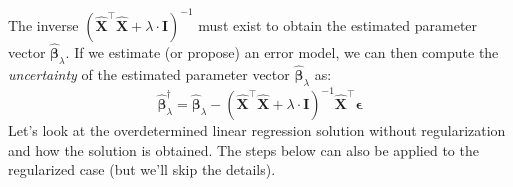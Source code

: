 \documentclass{article}[11pt]
\begin{document}
The inverse $\left(\hat{\mathbf{X}}^{\top}\hat{\mathbf{X}}+\lambda\cdot\mathbf{I}\right)^{-1}$ must exist to obtain the estimated parameter vector $\hat{\mathbf{\beta}}_{\lambda}$.
If we estimate (or propose) an error model, we can then compute the \textit{uncertainty} of the estimated parameter vector $\hat{\mathbf{\beta}}_{\lambda}$ as:
\begin{equation*}
\hat{\mathbf{\beta}}^{\dagger}_{\lambda} = \hat{\mathbf{\beta}}_{\lambda} - \left(\hat{\mathbf{X}}^{\top}\hat{\mathbf{X}}+\lambda\cdot\mathbf{I}\right)^{-1}\hat{\mathbf{X}}^{\top}\mathbf{\epsilon}
\end{equation*}
Let's look at the overdetermined linear regression solution without regularization and how the solution is obtained.
The steps below can also be applied to the regularized case (but we'll skip the details).
\end{document}

